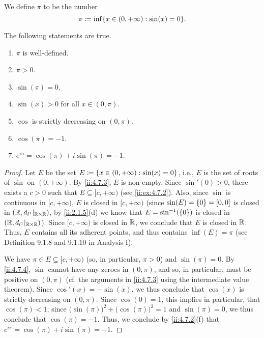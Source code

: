 \begin{defn}\label{ii:4.7.4}
  We define \(\pi\) to be the number
  \[
    \pi \coloneqq \inf\set{x \in (0, +\infty) : \sin(x) = 0}.
  \]
\end{defn}

\begin{ac}\label{ii:ac:4.7.2}
  The following statements are true.
  \begin{enumerate}
    \item \(\pi\) is well-defined.
    \item \(\pi > 0\).
    \item \(\sin(\pi) = 0\).
    \item \(\sin(x) > 0\) for all \(x \in (0, \pi)\).
    \item \(\cos\) is strictly decreasing on \((0, \pi)\).
    \item \(\cos(\pi) = -1\).
    \item \(e^{\pi i} = \cos(\pi) + i \sin(\pi) = -1\).
  \end{enumerate}
\end{ac}

\begin{proof}
  Let \(E\) be the set \(E \coloneqq \left\lbrace x \in (0, +\infty) : \sin(x) = 0\right\rbrace\), i.e., \(E\) is the set of roots of \(\sin\) on \((0, +\infty)\).
  By \cref{ii:4.7.3}, \(E\) is non-empty.
  Since \(\sin'(0) > 0\), there exists a \(c > 0\) such that \(E \subseteq [c, +\infty)\) (see \cref{ii:ex:4.7.2}).
  Also, since \(\sin\) is continuous in \([c, +\infty)\), \(E\) is closed in \([c, +\infty)\)
  (since \(\sin(E) = \left\lbrace0\right\rbrace = [0, 0]\) is closed in \((\mathbb{R}, d_{l^1}|_{\mathbb{R} \times \mathbb{R}})\), by \cref{ii:2.1.5}(d) we know that \(E = \sin^{-1}(\left\lbrace0\right\rbrace)\) is closed in \((\mathbb{R}, d_{l^1}|_{\mathbb{R} \times \mathbb{R}})\)).
  Since \([c, +\infty)\) is closed in \(\mathbb{R}\), we conclude that \(E\) is closed in \(\mathbb{R}\).
  Thus, \(E\) contains all its adherent points, and thus contains \(\inf(E) = \pi\) (see Definition 9.1.8 and 9.1.10 in Analysis I).

  We have \(\pi \in E \subseteq [c, +\infty)\) (so, in particular, \(\pi > 0\)) and \(\sin(\pi) = 0\).
  By \cref{ii:4.7.4}, \(\sin\) cannot have any zeroes in \((0, \pi)\), and so, in particular, must be positive on \((0, \pi)\)
  (cf. the arguments in \cref{ii:4.7.3} using the intermediate value theorem).
  Since \(\cos'(x) = -\sin(x)\), we thus conclude that \(\cos(x)\) is strictly decreasing on \((0, \pi)\).
  Since \(\cos(0) = 1\), this implies in particular, that \(\cos(\pi) < 1\);
  since \(\big(\sin(\pi)\big)^2 + \big(\cos(\pi)\big)^2 = 1\) and \(\sin(\pi) = 0\), we thus conclude that \(\cos(\pi) = -1\).
  Thus, we conclude by \cref{ii:4.7.2}(f) that \(e^{i \pi} = \cos(\pi) + i \sin(\pi) = -1\).
\end{proof}

